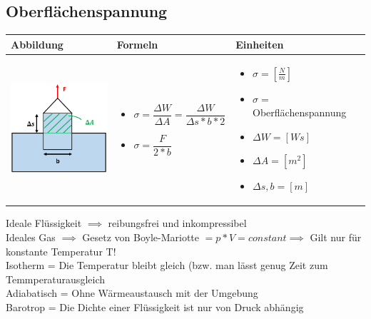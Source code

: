\subsection{Oberflächenspannung}				%
\begin{table}[h!]
	\begin{tabular}{ | m{6cm} | m{6cm} | m{6cm} | }
		\hline
		Abbildung & Formeln & Einheiten \\ \hline
		\midrule
		\begin{minipage}{.3\textwidth}
			\includegraphics[width=4.5cm]{Figures/oberflaechenspannung}
		\end{minipage}
		&
		\begin{itemize}
			\item $\sigma=\dfrac{\Delta W}{\Delta A}=\dfrac{\Delta W}{\Delta s * b * 2}$
			\item $\sigma=\dfrac{F}{2*b}$
			
		\end{itemize}
		& 
		\begin{itemize}
			\item $\sigma=[\frac{N}{m}]$
			\item $\sigma=$ Oberflächenspannung
			\item $\Delta W=[Ws]$
			\item $\Delta A=[m^2]$
		    \item $\Delta s,b=[m]$		
		\end{itemize}
		\\ \hline
	\end{tabular}
\end{table}

	{\color{red} Ideale Flüssigkeit $\implies$ reibungsfrei und inkompressibel} \\
	{\color{red}Ideales Gas $\implies$ Gesetz von Boyle-Mariotte $=p*V=constant\implies$ Gilt nur für konstante Temperatur T!} \\
	 Isotherm = Die Temperatur bleibt gleich (bzw. man lässt genug Zeit zum Temmperaturausgleich \\	
	 Adiabatisch = Ohne Wärmeaustausch mit der Umgebung\\
	 Barotrop = Die Dichte einer Flüssigkeit ist nur von Druck abhängig		\\

